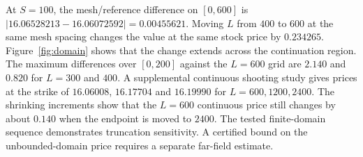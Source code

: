 \documentclass[11pt,a4paper]{article}
\numberwithin{equation}{section}
\begin{document}
At $S=100$, the mesh/reference difference on $[0,600]$ is
$|16.06528213-16.06072592|=0.00455621$. Moving $L$ from $400$
to $600$ at the same mesh spacing changes the value at the same stock price by
$0.234265$. Figure~\ref{fig:domain} shows that the change extends
across the continuation region. The maximum differences over $[0,200]$
against the $L=600$ grid are $2.140$ and $0.820$ for $L=300$ and $400$.
A supplemental continuous shooting study gives prices at the strike
of $16.06008$, $16.17704$ and $16.19990$ for $L=600,1200,2400$.
The shrinking increments show that the $L=600$ continuous price still
changes by about $0.140$ when the endpoint is moved to $2400$.
The tested finite-domain sequence demonstrates truncation sensitivity.
A certified bound on the unbounded-domain price requires a separate
far-field estimate.
\end{document}
